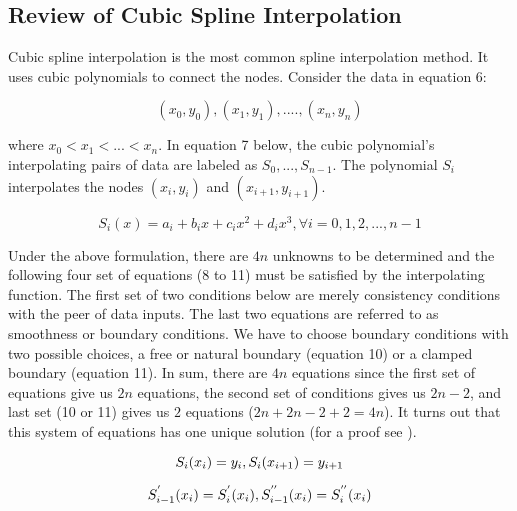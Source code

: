 \documentclass[12pt]{article}
\newcommand{\1}{\mathbbm 1}
\begin{document}
		
		
		\subsection{Review of Cubic Spline Interpolation}
		
		Cubic spline interpolation is the most common spline interpolation method. It uses cubic polynomials to connect the nodes. Consider the data in equation 6:
		
		\begin{equation}
			(x_{0}, y_{0}), (x_{1}, y_{1}), .... , (x_{n}, y_{n})
		\end{equation}
		
		
		where $x_{0} < x_{1} < ... < x_{n}$. In equation 7 below, the cubic polynomial's interpolating pairs of data are labeled as $S_{0},..., S_{n-1}$. The polynomial $S_{i}$ interpolates the nodes $(x_{i}, y_{i})$ and $(x_{i+1}, y_{i+1})$.
		
		
		\begin{equation}
			S_{i}(x) = a_{i} + b_{i}x + c_{i}x^{2} + d_{i}x^{3}, \forall i = 0, 1, 2, ... ,n-1
		\end{equation}
		
		
		Under the above formulation, there are $4n$ unknowns to be determined and the following four set of equations (8 to 11) must be satisfied by the interpolating function. The first set of two conditions below are merely consistency conditions with the peer of data inputs. The last two equations are referred to as smoothness or boundary conditions. We have to choose boundary conditions with two possible choices, a free or natural boundary (equation 10) or a clamped boundary (equation 11). In sum, there are $4n$ equations since the first set of equations give us $2n$ equations, the second set of conditions gives us $2n-2$, and last set (10 or 11) gives us $2$ equations ($2n + 2n -2 + 2 = 4n$). It turns out that this system of equations has one unique solution (for a proof see \cite{burden2015numerical}).
		
		
		
		
		\begin{equation}
			S_{i}(x_{i}) = y_{i}, \\ S_{i}(x_{i+1}) = y_{i+1}
		\end{equation}
		
		\begin{equation}
			S_{i-1}^{'}(x_{i}) = S_{i}^{'}(x_{i}), \\ S_{i-1}^{''}(x_{i}) = S_{i}^{''}(x_{i})
		\end{equation}
		
\end{document}
